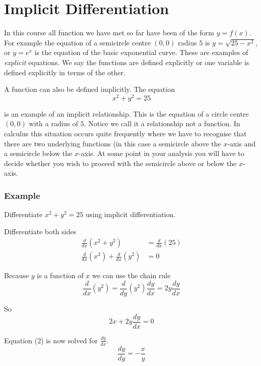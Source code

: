 \section{Implicit Differentiation}
In this course all function we have met so far have been of the form $y =f (x)$. For example the equation of a semicircle centre $(0 ,0)$ radius $5$ is $y =\sqrt{25 -x^{2}}$, or $y =e^{x}$ is the equation of the basic exponential curve. These are examples of \emph{explicit}
equations. We say the functions are defined explicitly or one variable is defined explicitly in terms of the
other. 

A function can also be defined implicitly. The equation
\begin{equation}x^{2} +y^{2} =25\tag{1}
\end{equation}

is an example of an implicit relationship. This
is the equation of a circle centre $(0 ,0)$ with a radius of $5$. Notice we call it a relationship not a function. In
calculus this situation occurs quite frequently where we have to recognise that there are two underlying functions (in this case a semicircle above the
$x$-axis and a semicircle below the $x$-axis. At some point in your analysis you will have to decide whether you wish to
proceed with the semicircle above or below the $x$-axis. 

\subsubsection{Example}
Differentiate $x^{2} +y^{2} =25$ using implicit differentiation. 

Differentiate both sides
\begin{align*}\frac{d}{d x} \left (x^{2} +y^{2}\right ) &  = \frac{d}{d x} \left (25\right ) \\
\frac{d}{d x} (x^{2}) +\frac{d}{d x} (y^{2}) &  = 0\end{align*}

Because $y$ is a function of $x$ we can use the chain rule
\begin{equation*}\frac{d}{d x} (y^{2}) =\frac{d}{d y} \left (y^{2}\right ) \frac{d y}{d x} =2 y \frac{d y}{d x}
\end{equation*}

So
\begin{equation}2 x +2 y \frac{d y}{d x} =0\tag{2}
\end{equation}

Equation (2) is now solved for $\frac{d y}{d x}$.
\begin{equation}\frac{d y}{d y} = -\frac{x}{y}\tag{3}
\end{equation}

